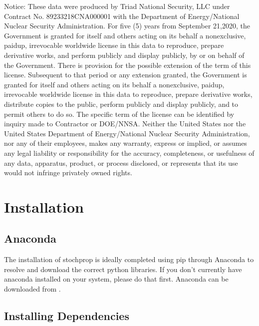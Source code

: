 \documentclass[letterpaper,10pt,english]{sphinxmanual}
\begin{document}
\sphinxAtStartPar
Notice: These data were produced by Triad National Security, LLC under Contract No. 89233218CNA000001 with the Department of Energy/National Nuclear Security Administration. For five (5) years from September 21,2020, the Government is granted for itself and others acting on its behalf a nonexclusive, paid\sphinxhyphen{}up, irrevocable worldwide license in this data to reproduce, prepare derivative works, and perform publicly and display publicly, by or on behalf of the Government. There is provision for the possible extension of the term of this license. Subsequent to that period or any extension granted, the Government is granted for itself and others acting on its behalf a nonexclusive, paid\sphinxhyphen{}up, irrevocable worldwide license in this data to reproduce, prepare derivative works, distribute copies to the public, perform publicly and display publicly, and to permit others to do so. The specific term of the license can be identified by inquiry made to Contractor or DOE/NNSA. Neither the United States nor the United States Department of Energy/National Nuclear Security Administration, nor any of their employees, makes any warranty, express or implied, or assumes any legal liability or responsibility for the accuracy, completeness, or usefulness of any data, apparatus, product, or process disclosed, or represents that its use would not infringe privately owned rights.


\section{Installation}
\label{\detokenize{installation:installation}}\label{\detokenize{installation:id1}}\label{\detokenize{installation::doc}}

\subsection{Anaconda}
\label{\detokenize{installation:anaconda}}
\sphinxAtStartPar
The installation of stochprop is ideally completed using pip through Anaconda to resolve and download the correct python libraries. If you don’t currently have anaconda installed
on your system, please do that first.  Anaconda can be downloaded from .


\subsection{Installing Dependencies}
\label{\detokenize{installation:installing-dependencies}}
\end{document}
